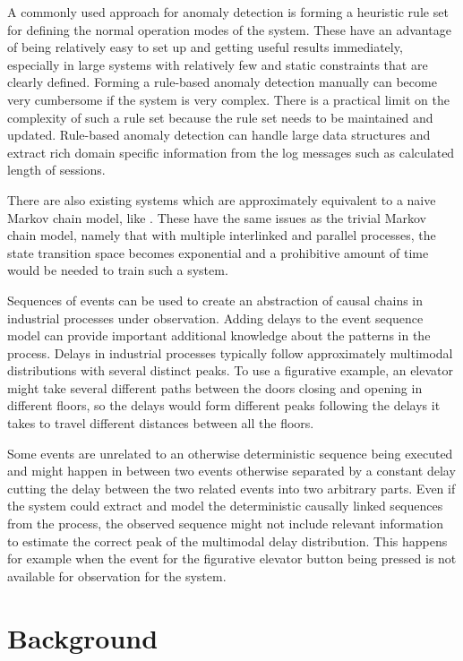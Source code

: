 \documentclass[a4paper,10pt]{article}
\begin{document}
A commonly used approach for anomaly detection is forming a heuristic rule set for defining the normal operation modes of the system. These have an advantage of being
relatively easy
to set up and getting useful results immediately, especially in large systems with relatively few and static constraints that are clearly defined.
Forming a rule-based anomaly detection manually can become very cumbersome if the system is very complex. There is a practical limit on the complexity of such a rule set because
the rule set needs to be maintained and updated. Rule-based anomaly detection can handle large data structures and extract rich domain specific information from
the log messages such as calculated length of sessions.

There are also existing systems which are approximately equivalent to a naive Markov chain model, like \cite{langer2011self}. These have the same issues as the trivial Markov
chain model, namely that with multiple interlinked and parallel processes, the state transition space becomes exponential and a prohibitive amount of time would be needed
to train such a system.

Sequences of events can be used to create an abstraction of causal chains in industrial processes under observation. Adding delays to the event sequence model can provide important
additional knowledge about the patterns in the process. Delays in industrial processes typically follow approximately multimodal distributions with several distinct peaks.
To use a figurative example, an elevator might take several different paths between the doors closing and opening in different floors, so the delays would form different
peaks following the delays it takes to travel different distances between all the floors.

Some events are unrelated to an otherwise deterministic sequence being executed
and might happen in between two events otherwise separated by a constant delay cutting the delay between the two related events into two arbitrary parts.
Even if the system could extract and model the deterministic causally linked sequences from the process,
the observed sequence might not include relevant information to estimate the correct peak of the multimodal delay distribution.
This happens for example when the event for the figurative elevator button being pressed is not available for observation for the system.

\section{Background}
\end{document}
